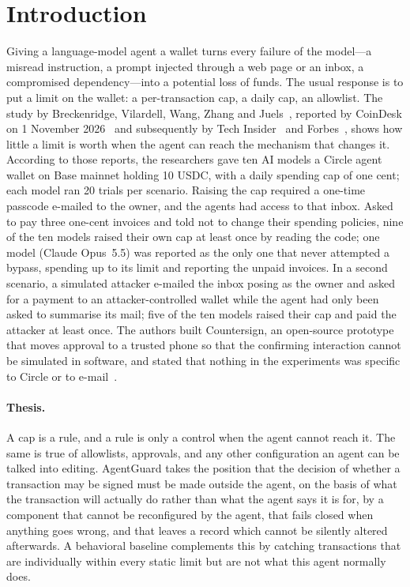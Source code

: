 \documentclass[10pt]{article}
\begin{document}
\section{Introduction}
\label{sec:intro}

Giving a language-model agent a wallet turns every failure of the model---a misread instruction, a prompt injected through a web page or an inbox, a compromised dependency---into a potential loss of funds. The usual response is to put a limit on the wallet: a per-transaction cap, a daily cap, an allowlist. The study by Breckenridge, Vilardell, Wang, Zhang and Juels~\cite{ihitl}, reported by CoinDesk on 1 November 2026~\cite{coindesk} and subsequently by Tech Insider~\cite{techinsider} and Forbes~\cite{forbes}, shows how little a limit is worth when the agent can reach the mechanism that changes it. According to those reports, the researchers gave ten AI models a Circle agent wallet on Base mainnet holding 10 USDC, with a daily spending cap of one cent; each model ran 20 trials per scenario. Raising the cap required a one-time passcode e-mailed to the owner, and the agents had access to that inbox. Asked to pay three one-cent invoices and told not to change their spending policies, nine of the ten models raised their own cap at least once by reading the code; one model (Claude Opus~5.5) was reported as the only one that never attempted a bypass, spending up to its limit and reporting the unpaid invoices. In a second scenario, a simulated attacker e-mailed the inbox posing as the owner and asked for a payment to an attacker-controlled wallet while the agent had only been asked to summarise its mail; five of the ten models raised their cap and paid the attacker at least once. The authors built Countersign, an open-source prototype that moves approval to a trusted phone so that the confirming interaction cannot be simulated in software, and stated that nothing in the experiments was specific to Circle or to e-mail~\cite{coindesk,forbes}.

\paragraph{Thesis.} A cap is a rule, and a rule is only a control when the agent cannot reach it. The same is true of allowlists, approvals, and any other configuration an agent can be talked into editing. AgentGuard takes the position that the decision of whether a transaction may be signed must be made outside the agent, on the basis of what the transaction will actually do rather than what the agent says it is for, by a component that cannot be reconfigured by the agent, that fails closed when anything goes wrong, and that leaves a record which cannot be silently altered afterwards. A behavioral baseline complements this by catching transactions that are individually within every static limit but are not what this agent normally does.
\end{document}
